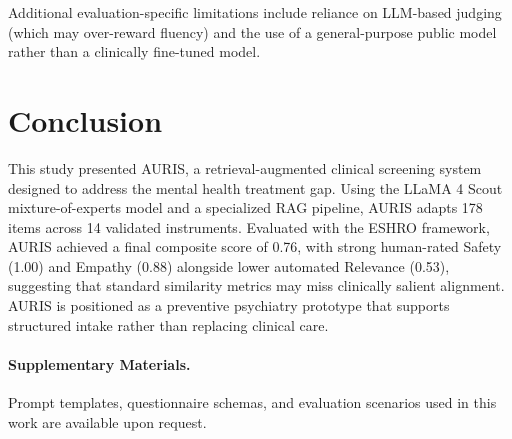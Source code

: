 \documentclass[sigconf]{acmart}
\begin{document}
Additional evaluation-specific limitations include reliance on LLM-based judging (which may over-reward fluency) and the use of a general-purpose public model rather than a clinically fine-tuned model.

\section{Conclusion}
This study presented AURIS, a retrieval-augmented clinical screening system designed to address the mental health treatment gap. Using the LLaMA 4 Scout mixture-of-experts model and a specialized RAG pipeline, AURIS adapts 178 items across 14 validated instruments. Evaluated with the ESHRO framework, AURIS achieved a final composite score of 0.76, with strong human-rated Safety (1.00) and Empathy (0.88) alongside lower automated Relevance (0.53), suggesting that standard similarity metrics may miss clinically salient alignment. AURIS is positioned as a preventive psychiatry prototype that supports structured intake rather than replacing clinical care.

\paragraph{Supplementary Materials.} Prompt templates, questionnaire schemas, and evaluation scenarios used in this work are available upon request.
\end{document}
